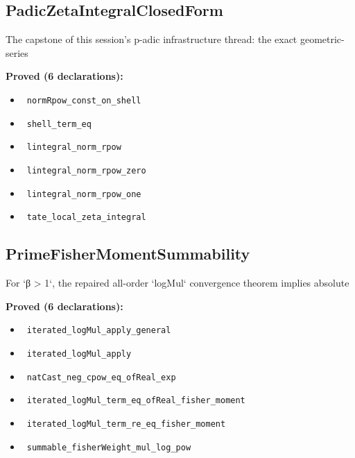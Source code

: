 \documentclass{report}
\theoremstyle{definition}
\begin{document}
\subsection{PadicZetaIntegralClosedForm}
The capstone of this session's p-adic infrastructure thread: the exact geometric-series

\noindent\textbf{Proved (6 declarations):}
\begin{itemize}
  \item {}\leanok\ \texttt{normRpow\_const\_on\_shell}
  \item {}\leanok\ \texttt{shell\_term\_eq}
  \item {}\leanok\ \texttt{lintegral\_norm\_rpow}
  \item {}\leanok\ \texttt{lintegral\_norm\_rpow\_zero}
  \item {}\leanok\ \texttt{lintegral\_norm\_rpow\_one}
  \item {}\leanok\ \texttt{tate\_local\_zeta\_integral}
\end{itemize}

\subsection{PrimeFisherMomentSummability}
For `β > 1`, the repaired all-order `logMul` convergence theorem implies absolute

\noindent\textbf{Proved (6 declarations):}
\begin{itemize}
  \item {}\leanok\ \texttt{iterated\_logMul\_apply\_general}
  \item {}\leanok\ \texttt{iterated\_logMul\_apply}
  \item {}\leanok\ \texttt{natCast\_neg\_cpow\_eq\_ofReal\_exp}
  \item {}\leanok\ \texttt{iterated\_logMul\_term\_eq\_ofReal\_fisher\_moment}
  \item {}\leanok\ \texttt{iterated\_logMul\_term\_re\_eq\_fisher\_moment}
  \item {}\leanok\ \texttt{summable\_fisherWeight\_mul\_log\_pow}
\end{itemize}
\end{document}
